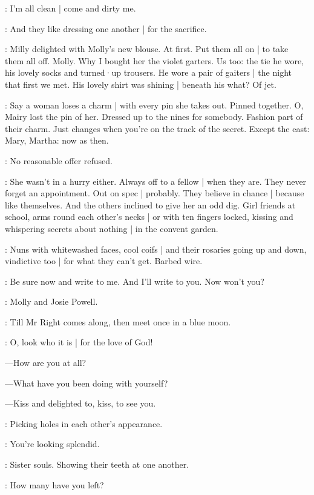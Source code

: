 \BloomOther:
I'm all clean |
come and dirty me.

\BloomAbstract:
And they like dressing one another |
for the sacrifice.

\BloomHist:
Milly delighted with Molly's new blouse.
At first.
Put them all on |
to take them all off.
Molly.
Why I bought her the violet garters.%
Us too:
the tie he wore,
his lovely socks and turned·up trousers.
He wore a pair of gaiters |
the night that first we met.
His lovely shirt was shining |
beneath his what?
Of jet.

\BloomAbstract:
Say a woman loses a charm |
with every pin she takes out.
Pinned together.
O,
Mairy lost the pin of her.
Dressed up to the nines for somebody.
Fashion part of their charm.
Just changes when you're on the track of the secret.
Except the east:
Mary,
Martha:
now as then.

\BloomOther:
No reasonable offer refused.

\BloomCurrent:
She wasn't in a hurry either.
Always off to a fellow |
when they are.
They never forget an appointment.
Out on spec |
probably.
They believe in chance |
because like themselves.
And the others inclined to give her an odd dig.
Girl friends at school,
arms round each other's necks |%
or with ten fingers locked,
kissing and whispering secrets about nothing |
in the convent garden.

\BloomAbstract:
Nuns with whitewashed faces,
cool coifs |
and their rosaries
going up and down,
vindictive too |
for what they can't get.
Barbed wire.

\BloomOther:
Be sure now and write to me.
And I'll write to you.
Now won't you?

\BloomHist:
Molly and Josie Powell.

\BloomAbstract:
Till Mr Right comes along,
then meet once in a blue moon.

\BloomOther:
O,
look who it is |
for the love of God!

---How are you at all?

---What have you been doing with yourself?

---Kiss and delighted to,
kiss,
to see you.

\BloomAbstract:
Picking holes in each other's appearance.

\BloomOther:
You're looking splendid.

\BloomAbstract:
Sister souls.
Showing their teeth at one another.

\BloomOther:
How many have you left?

